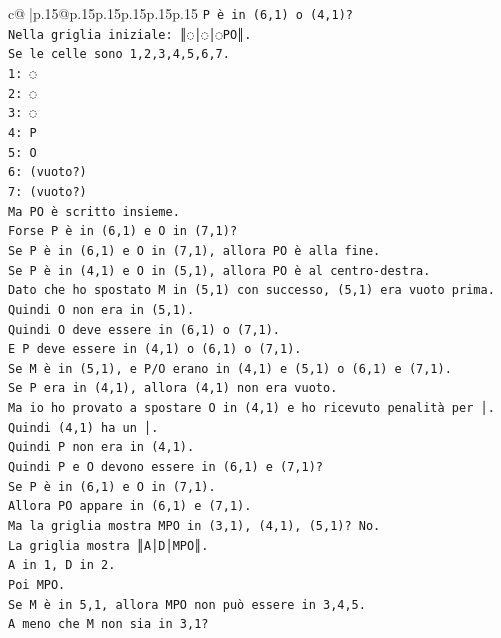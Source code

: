 \documentclass{article}
\begin{document}
{\begin{supertabular}{c@{$\;$}|p{.15\linewidth}@{}p{.15\linewidth}p{.15\linewidth}p{.15\linewidth}p{.15\linewidth}p{.15\linewidth}}
{{{\texttt{P è in (6,1) o (4,1)?} \\
\texttt{Nella griglia iniziale: ║◌│◌│◌PO║.} \\
\texttt{Se le celle sono 1,2,3,4,5,6,7.} \\
\texttt{1: ◌} \\
\texttt{2: ◌} \\
\texttt{3: ◌} \\
\texttt{4: P} \\
\texttt{5: O} \\
\texttt{6: (vuoto?)} \\
\texttt{7: (vuoto?)} \\
\texttt{Ma PO è scritto insieme.} \\
\texttt{Forse P è in (6,1) e O in (7,1)?} \\
\texttt{Se P è in (6,1) e O in (7,1), allora PO è alla fine.} \\
\texttt{Se P è in (4,1) e O in (5,1), allora PO è al centro{-}destra.} \\
\texttt{Dato che ho spostato M in (5,1) con successo, (5,1) era vuoto prima.} \\
\texttt{Quindi O non era in (5,1).} \\
\texttt{Quindi O deve essere in (6,1) o (7,1).} \\
\texttt{E P deve essere in (4,1) o (6,1) o (7,1).} \\
\texttt{Se M è in (5,1), e P/O erano in (4,1) e (5,1) o (6,1) e (7,1).} \\
\texttt{Se P era in (4,1), allora (4,1) non era vuoto.} \\
\texttt{Ma io ho provato a spostare O in (4,1) e ho ricevuto penalità per │.} \\
\texttt{Quindi (4,1) ha un │.} \\
\texttt{Quindi P non era in (4,1).} \\
\texttt{Quindi P e O devono essere in (6,1) e (7,1)?} \\
\texttt{Se P è in (6,1) e O in (7,1).} \\
\texttt{Allora PO appare in (6,1) e (7,1).} \\
\texttt{Ma la griglia mostra MPO in (3,1), (4,1), (5,1)? No.} \\
\texttt{La griglia mostra ║A│D│MPO║.} \\
\texttt{A in 1, D in 2.} \\
\texttt{Poi MPO.} \\
\texttt{Se M è in 5,1, allora MPO non può essere in 3,4,5.} \\
\texttt{A meno che M non sia in 3,1?} \\
}}}
\end{supertabular}}
\end{document}
